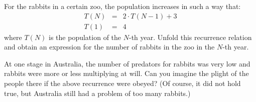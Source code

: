 For the rabbits in a certain zoo, the population increases in
such a way that:
%
\begin{eqnarray}
    T(N) & = & 2 \cdot  T(N-1) + 3 \nonumber  \\
        T(1) & = & 4 \nonumber
\end{eqnarray} 
%
where $T(N)$ is the population of the $N$-th year. Unfold this 
recurrence relation and obtain an expression for the number of rabbits
in the zoo in the $N$-th year.

At one stage in Australia, the number of predators for rabbits was
very low and rabbits were more or less multiplying at will. Can you
imagine the plight of the people there if the above recurrence were
obeyed? (Of course, it did not hold true, but Australia still had a
problem of too many rabbits.)





